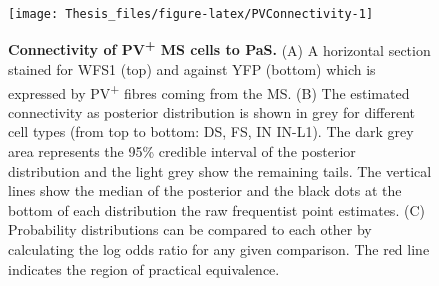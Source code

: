 \documentclass[
  12pt,
  a4paper,
  openany]{book}
\begin{document}
\begin{figure}[htb]

{\centering \texttt{[image: Thesis\_files/figure-latex/PVConnectivity-1]} 

}

\caption[Connectivity of PV\textsuperscript{+} MS cells to PaS]{\textbf{Connectivity of PV\textsuperscript{+} MS cells to PaS.} (A) A horizontal section stained for WFS1 (top) and against YFP (bottom) which is expressed by PV\textsuperscript{+} fibres coming from the MS. (B) The estimated connectivity as posterior distribution is shown in grey for different cell types (from top to bottom: DS, FS, IN IN-L1). The dark grey area represents the 95\% credible interval of the posterior distribution and the light grey show the remaining tails. The vertical lines show the median of the posterior and the black dots at the bottom of each distribution the raw frequentist point estimates. (C) Probability distributions can be compared to each other by calculating the log odds ratio for any given comparison. The red line indicates the region of practical equivalence.}\label{fig:PVConnectivity}
\end{figure}
\end{document}
